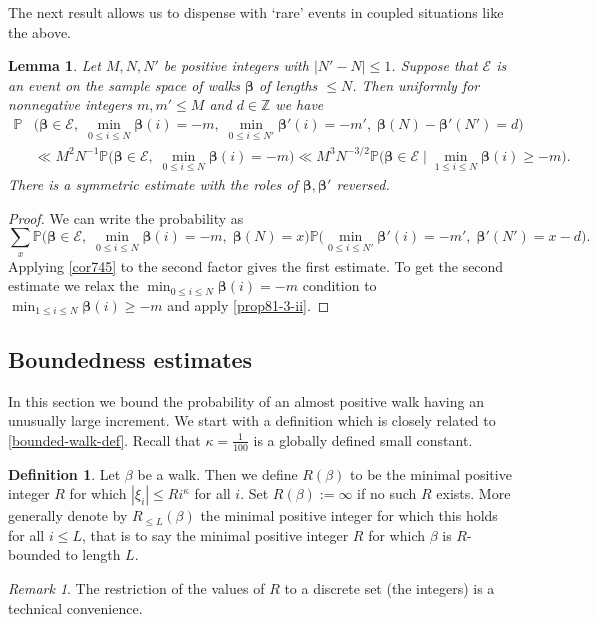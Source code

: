 \documentclass[11pt,reqno]{amsart}
\numberwithin{equation}{section}
\newtheorem{lemma}[theorem]{Lemma}
\theoremstyle{definition}
\newtheorem{definition}[theorem]{Definition}
\theoremstyle{remark}
\newtheorem*{remark}{Remark}
\newcommand{\mb}{\mathbb}
\def\boldbeta{\boldsymbol\beta}
\renewcommand{\le}{\leqslant}
\renewcommand{\ge}{\geqslant}
\newcommand\Z{\mathbb{Z}}
\begin{document}
The next result allows us to dispense with `rare' events in coupled situations like the above.


\begin{lemma}\label{lem13.7a}
Let $M, N,N'$ be positive integers with $|N' - N| \le 1$. Suppose that $\mathcal{E}$ is an event on the sample space of walks $\boldbeta$ of lengths $\le N$. Then uniformly for nonnegative integers $m, m'\le M$ and $d \in \Z$ we have
\begin{align*} \mb{P}&\big(\boldbeta \in \mathcal{E}, \; \min_{0 \le i \le N}  \boldbeta(i) = -m, \; \min_{0 \le i\le N'}  \boldbeta'(i) = -m', \;\boldbeta(N) - \boldbeta'(N') = d\big) \\ & \ll M^2 N^{-1} \mb{P} \big( \boldbeta \in \mathcal{E}, \;\min_{0 \le i \le N} \boldbeta(i) = -m\big)  \ll M^{3} N^{-3/2} \mb{P} \big( \boldbeta \in \mathcal{E} \mid \min_{1 \le i \le N} \boldbeta(i) \ge -m\big)  .\end{align*}
 There is a symmetric estimate with the roles of $\boldbeta, \boldbeta'$ reversed.   
\end{lemma}
\begin{proof}
We can write the probability as
\[ \sum_x \mb{P} \big( \boldbeta \in \mathcal{E}, \;\min_{0 \le i \le N} \boldbeta(i) = -m, \;\boldbeta(N) = x\big)\mb{P} \big( \min_{0 \le i \le N'} \boldbeta'(i) = -m',\; \boldbeta'(N') = x - d\big).\]
Applying \cref{cor745} to the second factor gives the first estimate. To get the second estimate we relax the $\min_{0 \le i \le N} \boldbeta(i) = - m$ condition to $\min_{1 \le i \le N}\boldbeta(i) \ge -m$ and apply \cref{prop81-3-ii}.
\end{proof}


\subsection{Boundedness estimates}  In this section we bound the probability of an almost positive walk having an unusually large increment. We start with a definition which is closely related to \cref{bounded-walk-def}. Recall that $\kappa = \frac{1}{100}$ is a globally defined small constant.

\begin{definition}\label{r-beta-def}
Let $\beta$ be a walk. Then we define $R(\beta)$ to be the minimal positive integer $R$ for which $|\xi_i| \le R i^{\kappa}$ for all $i$. Set $R(\beta) := \infty$ if no such $R$ exists. More generally denote by $R_{\le L}(\beta)$ the minimal positive integer for which this holds for all $i \le L$, that is to say the minimal positive integer $R$ for which $\beta$ is $R$-bounded to length $L$.
\end{definition} 
\begin{remark}
The restriction of the values of $R$ to a discrete set (the integers) is a technical convenience.   
\end{remark}
\end{document}
